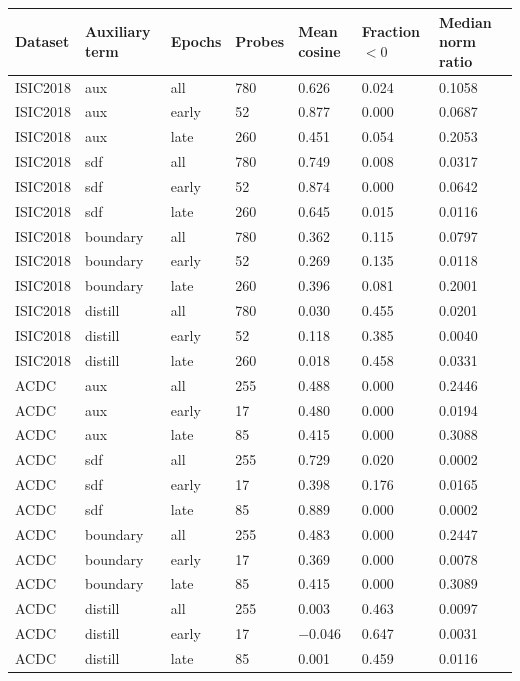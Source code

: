 \begin{tabular}{lllllll}
\toprule
Dataset & Auxiliary term & Epochs & Probes & Mean cosine & Fraction $<0$ & Median norm ratio \\
\midrule
ISIC2018 & aux & all & 780 & 0.626 & 0.024 & 0.1058 \\
ISIC2018 & aux & early & 52 & 0.877 & 0.000 & 0.0687 \\
ISIC2018 & aux & late & 260 & 0.451 & 0.054 & 0.2053 \\
ISIC2018 & sdf & all & 780 & 0.749 & 0.008 & 0.0317 \\
ISIC2018 & sdf & early & 52 & 0.874 & 0.000 & 0.0642 \\
ISIC2018 & sdf & late & 260 & 0.645 & 0.015 & 0.0116 \\
ISIC2018 & boundary & all & 780 & 0.362 & 0.115 & 0.0797 \\
ISIC2018 & boundary & early & 52 & 0.269 & 0.135 & 0.0118 \\
ISIC2018 & boundary & late & 260 & 0.396 & 0.081 & 0.2001 \\
ISIC2018 & distill & all & 780 & 0.030 & 0.455 & 0.0201 \\
ISIC2018 & distill & early & 52 & 0.118 & 0.385 & 0.0040 \\
ISIC2018 & distill & late & 260 & 0.018 & 0.458 & 0.0331 \\
ACDC & aux & all & 255 & 0.488 & 0.000 & 0.2446 \\
ACDC & aux & early & 17 & 0.480 & 0.000 & 0.0194 \\
ACDC & aux & late & 85 & 0.415 & 0.000 & 0.3088 \\
ACDC & sdf & all & 255 & 0.729 & 0.020 & 0.0002 \\
ACDC & sdf & early & 17 & 0.398 & 0.176 & 0.0165 \\
ACDC & sdf & late & 85 & 0.889 & 0.000 & 0.0002 \\
ACDC & boundary & all & 255 & 0.483 & 0.000 & 0.2447 \\
ACDC & boundary & early & 17 & 0.369 & 0.000 & 0.0078 \\
ACDC & boundary & late & 85 & 0.415 & 0.000 & 0.3089 \\
ACDC & distill & all & 255 & 0.003 & 0.463 & 0.0097 \\
ACDC & distill & early & 17 & $-$0.046 & 0.647 & 0.0031 \\
ACDC & distill & late & 85 & 0.001 & 0.459 & 0.0116 \\

\end{tabular}
